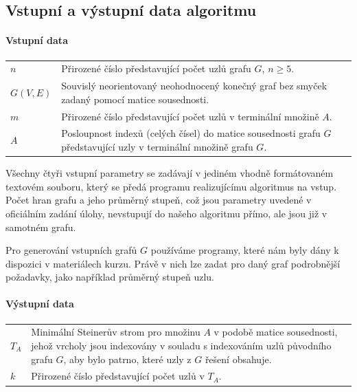\documentclass[12pt]{article}
\theoremstyle{definition}
\begin{document}
\subsection{Vstupní a výstupní data algoritmu}
\paragraph{Vstupní data}\mbox{}\newline
\begin{center}
\begin{tabular}{p{1.5cm}|p{10cm}}
	$n$ & Přirozené číslo představující počet uzlů grafu $G$, $n\geq 5$.\\
	$G(V,E)$ & Souvislý neorientovaný neohodnocený konečný graf bez smyček zadaný
	pomocí matice sousednosti.\\
	$m$ & Přirozené číslo představující počet uzlů v terminální množině $A$.\\
	$A$ & Posloupnost indexů (celých čísel) do matice sousednosti grafu $G$ představující uzly v terminální množině
	grafu $G$.
\end{tabular}\newline
\end{center}


Všechny čtyři vstupní parametry se zadávají v jediném vhodně formátovaném textovém souboru, který se předá programu realizujícímu algoritmus na vstup. Počet hran grafu
a jeho průměrný stupeň, což jsou parametry uvedené v oficiálním zadání úlohy, nevstupují
do našeho algoritmu přímo, ale jsou již  v samotném grafu.

Pro generování vstupních grafů $G$ používáme programy, které nám byly dány k dispozici v materiálech kurzu. Právě v nich lze zadat pro daný graf podrobnější požadavky, jako například průměrný stupeň uzlu.
\paragraph{Výstupní data}\mbox{}\newline
\begin{center}
	\begin{tabular}{p{0.5cm}|p{10cm}}
		$T_A$ & Minimální Steinerův strom pro množinu $A$ v podobě matice sousednosti, jehož vrcholy jsou
		indexovány v souladu s indexováním uzlů původního grafu $G$, aby bylo patrno, které uzly z $G$ řešení obsahuje.\\
		$k$ & Přirozené číslo představující počet uzlů v $T_A$.
	\end{tabular}
	\newline
\end{center}
\end{document}
